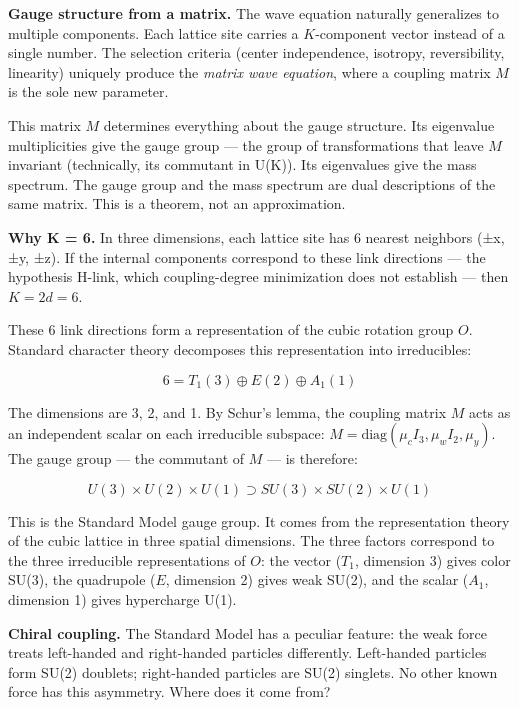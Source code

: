 \documentclass[
]{article}
\begin{document}
\textbf{Gauge structure from a matrix.} The wave equation naturally
generalizes to multiple components. Each lattice site carries a
\(K\)-component vector instead of a single number. The selection
criteria (center independence, isotropy, reversibility, linearity)
uniquely produce the \emph{matrix wave equation}, where a coupling
matrix \(M\) is the sole new parameter.

This matrix \(M\) determines everything about the gauge structure. Its
eigenvalue multiplicities give the gauge group --- the group of
transformations that leave \(M\) invariant (technically, its commutant
in U(K)). Its eigenvalues give the mass spectrum. The gauge group and
the mass spectrum are dual descriptions of the same matrix. This is a
theorem, not an approximation.

\textbf{Why K = 6.} In three dimensions, each lattice site has 6 nearest
neighbors (±x, ±y, ±z). If the internal components correspond to these
link directions --- the hypothesis H-link, which coupling-degree
minimization does not establish --- then \(K = 2d = 6\).

These 6 link directions form a representation of the cubic rotation
group \(O\). Standard character theory decomposes this representation
into irreducibles:

\[6 = T_1(3) \oplus E(2) \oplus A_1(1)\]

The dimensions are 3, 2, and 1. By Schur's lemma, the coupling matrix
\(M\) acts as an independent scalar on each irreducible subspace:
\(M = \text{diag}(\mu_c I_3, \mu_w I_2, \mu_y)\). The gauge group ---
the commutant of \(M\) --- is therefore:

\[U(3) \times U(2) \times U(1) \supset SU(3) \times SU(2) \times U(1)\]

This is the Standard Model gauge group. It comes from the representation
theory of the cubic lattice in three spatial dimensions. The three
factors correspond to the three irreducible representations of \(O\):
the vector (\(T_1\), dimension 3) gives color SU(3), the quadrupole
(\(E\), dimension 2) gives weak SU(2), and the scalar (\(A_1\),
dimension 1) gives hypercharge U(1).

\textbf{Chiral coupling.} The Standard Model has a peculiar feature: the
weak force treats left-handed and right-handed particles differently.
Left-handed particles form SU(2) doublets; right-handed particles are
SU(2) singlets. No other known force has this asymmetry. Where does it
come from?
\end{document}
